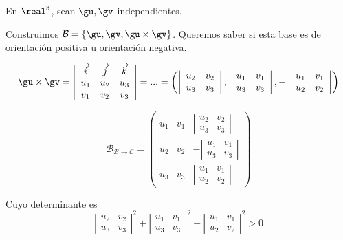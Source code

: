 En $\real^3$, sean $\gu,\gv$ independientes.

Construimos $\mathcal{B} = \{\gu,\gv,\gu\times\gv\}$. Queremos saber si esta base es de orientación positiva u orientación negativa.

\[\gu\times\gv = \left|
\begin{array}{ccc}
 \overrightarrow{i} & \overrightarrow{j} & \overrightarrow{k}\\
u_1 & u_2 & u_3 \\
v_1 & v_2 & v_3
 \end{array}\right| = ... = \left(\left|\begin{array}{cc}u_2&v_2\\u_3&v_3\end{array}\right|,\left|\begin{array}{cc}u_1&v_1\\u_3&v_3\end{array}\right|,-\left|\begin{array}{cc}u_1&v_1\\u_2&v_2\end{array}\right|\right)\]

 \[\mathcal{B}_{\mathcal{B}\to\mathcal{C}} = \begin{pmatrix}
u_1&v_1& \left|\begin{array}{cc} u_2&v_2\\u_3&v_3 \end{array}\right|\\

u_2&v_2& -\left|\begin{array}{cc} u_1&v_1\\u_3&v_3 \end{array}\right|\\

u_3&v_3& \left|\begin{array}{cc} u_1&v_1\\u_2&v_2\end{array}\right|
 \end{pmatrix}\]

 Cuyo determinante es \[\left|\begin{array}{cc}u_2&v_2\\u_3&v_3\end{array}\right|^2+\left|\begin{array}{cc}u_1&v_1\\u_3&v_3\end{array}\right|^2+\left|\begin{array}{cc}u_1&v_1\\u_2&v_2\end{array}\right|^2>0\]


